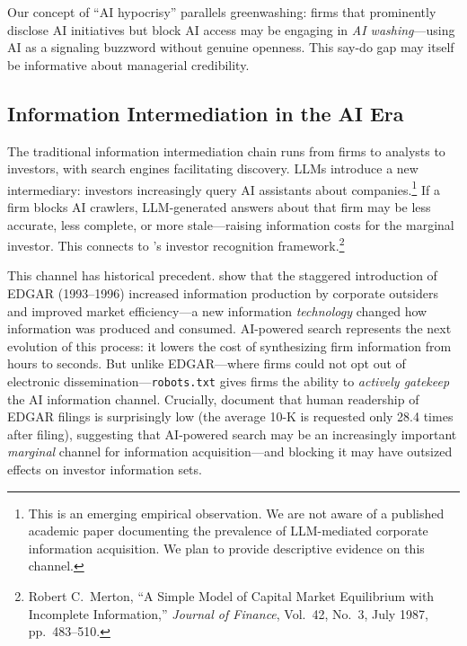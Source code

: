 \documentclass[12pt,a4paper]{article}
\begin{document}
Our concept of ``AI hypocrisy'' parallels greenwashing: firms that prominently disclose AI initiatives but block AI access may be engaging in \emph{AI washing}---using AI as a signaling buzzword without genuine openness. This say-do gap may itself be informative about managerial credibility.

\subsection{Information Intermediation in the AI Era}

The traditional information intermediation chain runs from firms to analysts to investors, with search engines facilitating discovery. LLMs introduce a new intermediary: investors increasingly query AI assistants about companies.\footnote{This is an emerging empirical observation. We are not aware of a published academic paper documenting the prevalence of LLM-mediated corporate information acquisition. We plan to provide descriptive evidence on this channel.} If a firm blocks AI crawlers, LLM-generated answers about that firm may be less accurate, less complete, or more stale---raising information costs for the marginal investor. This connects to \citet{Merton1987}'s investor recognition framework.\footnote{Robert C.~Merton, ``A Simple Model of Capital Market Equilibrium with Incomplete Information,'' \emph{Journal of Finance}, Vol.~42, No.~3, July 1987, pp.~483--510.}

This channel has historical precedent. \citet{GaoHuang2020} show that the staggered introduction of EDGAR (1993--1996) increased information production by corporate outsiders and improved market efficiency---a new information \emph{technology} changed how information was produced and consumed. AI-powered search represents the next evolution of this process: it lowers the cost of synthesizing firm information from hours to seconds. But unlike EDGAR---where firms could not opt out of electronic dissemination---\texttt{robots.txt} gives firms the ability to \emph{actively gatekeep} the AI information channel. Crucially, \citet{LoughranMcDonald2017} document that human readership of EDGAR filings is surprisingly low (the average 10-K is requested only 28.4 times after filing), suggesting that AI-powered search may be an increasingly important \emph{marginal} channel for information acquisition---and blocking it may have outsized effects on investor information sets.
\end{document}
